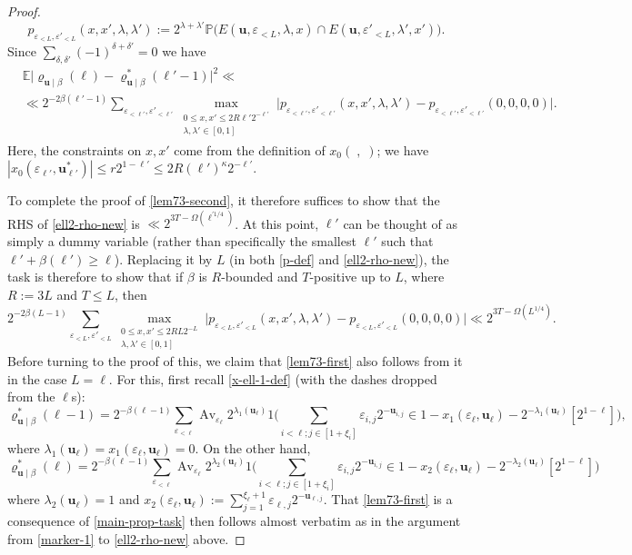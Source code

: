 \documentclass[11pt,reqno]{amsart}
\numberwithin{equation}{section}
\theoremstyle{definition}
\theoremstyle{remark}
\newcommand\Av{\operatorname{Av}}
\newcommand{\mb}{\mathbb}
\newcommand{\mbf}{\mathbf}
\newcommand{\eps}{\varepsilon}
\renewcommand{\le}{\leqslant}
\renewcommand{\ge}{\geqslant}
\begin{document}
\begin{proof}
\begin{equation}\label{p-def} p_{\eps_{< L}, \eps'_{< L}}(x,x',\lambda, \lambda') := 2^{\lambda+ \lambda'} \mb{P} \big( E(\mbf{u},\eps_{< L},\lambda, x) \cap E(\mbf{u}, \eps'_{< L},\lambda', x')\big).\end{equation}
Since $\sum_{\delta, \delta'} (-1)^{\delta + \delta'} = 0$ we have
\begin{align}\nonumber & \mb{E} \big|\varrho_{\mbf{u} \mid \beta}(\ell) -\varrho^*_{\mbf{u} \mid \beta}(\ell'-1) \big|^2 \ll \\ &  \ll 2^{-2\beta(\ell'-1)} \sum_{\eps_{< \ell'},\eps'_{<\ell'}} \max_{\substack{0 \le x,x' \le 2R\ell' 2^{-\ell'} \\ \lambda,\lambda' \in [0,1]}} \big| p_{\eps_{< \ell'}, \eps'_{< \ell'}}(x, x', \lambda,\lambda') - p_{\eps_{< \ell'},\eps'_{< \ell'}}(0,0,0,0)\big|.\label{ell2-rho-new}\end{align} Here, the constraints on $x,x'$ come from the definition of $x_0( \; , \;)$; we have $|x_0(\eps_{\ell'}, \mbf{u}^*_{\ell'})| \le r 2^{1-\ell'} \le 2R(\ell')^{\kappa} 2^{-\ell'}$.

To complete the proof of \cref{lem73-second}, it therefore suffices to show that the RHS of \cref{ell2-rho-new} is $\ll 2^{3T - \Omega(\ell^{\prime 1/4})}$. At this point, $\ell'$ can be thought of as simply a dummy variable (rather than specifically the smallest $\ell'$ such that $\ell' + \beta(\ell') \ge \ell$). Replacing it by $L$ (in both \cref{p-def} and \cref{ell2-rho-new}), the task is therefore to show that if $\beta$ is $R$-bounded and $T$-positive up to $L$, where $R := 3L$ and $T \le L$, then
\begin{equation}\label{main-prop-task} 2^{-2\beta(L-1)} \sum_{\eps_{< L},\eps'_{< L}} \max_{\substack{0 \le x,x' \le 2RL 2^{-L} \\ \lambda,\lambda' \in [0,1]}} \big| p_{\eps_{< L}, \eps'_{< L}}(x, x', \lambda,\lambda') - p_{\eps_{< L},\eps'_{< L}}(0,0,0,0)\big| \ll 2^{3T - \Omega(L^{1/4})}.\end{equation}
Before turning to the proof of this, we claim that \cref{lem73-first} also follows from it in the case $L = \ell$. For this, first recall \cref{x-ell-1-def} (with the dashes dropped from the $\ell$s):
\[ \varrho^*_{\mbf{u} \mid \beta}(\ell-1) = 2^{-\beta(\ell-1)} \sum_{\eps_{< \ell}} \Av_{\eps_{\ell}} 2^{\lambda_1(\mbf{u}_{\ell})} 1\big( \sum_{i < \ell;j \in [1 + \xi_i]} \eps_{i,j} 2^{-\mbf{u}_{i,j}} \in 1- x_1(\eps_{\ell}, \mbf{u}_{\ell}) - 2^{-\lambda_1(\mbf{u}_{\ell})} [2^{1-\ell}]\Big),\] where $\lambda_1(\mbf{u}_{\ell}) = x_1(\eps_{\ell}, \mbf{u}_{\ell}) = 0$.
On the other hand, 
\[ \varrho^*_{\mbf{u} \mid \beta}(\ell) = 2^{-\beta(\ell-1)} \sum_{\eps_{< \ell}} \Av_{\eps_{\ell}} 2^{\lambda_2(\mbf{u}_{\ell})} 1\big( \sum_{i < \ell;j \in [1 + \xi_i]} \eps_{i,j} 2^{-\mbf{u}_{i,j}} \in 1- x_2(\eps_{\ell}, \mbf{u}_{\ell}) - 2^{-\lambda_2(\mbf{u}_{\ell})} [2^{1-\ell}]\Big)\]
where $\lambda_2(\mbf{u}_{\ell}) = 1$ and $x_2(\eps_{\ell}, \mbf{u}_{\ell}) := \sum_{j = 1}^{\xi_{\ell} + 1} \eps_{\ell, j} 2^{-\mbf{u}_{\ell,j}}$. That \cref{lem73-first} is a consequence of \cref{main-prop-task} then follows almost verbatim as in the argument from \cref{marker-1} to \cref{ell2-rho-new} above.


\end{proof}
\end{document}
